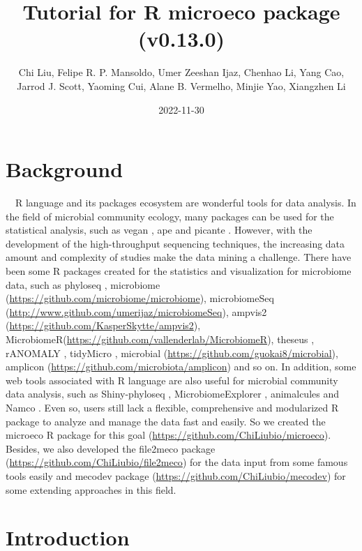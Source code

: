 \documentclass[
]{book}
\title{Tutorial for R microeco package (v0.13.0)}
\author{Chi Liu, Felipe R. P. Mansoldo, Umer Zeeshan Ijaz, Chenhao Li, Yang Cao, Jarrod J. Scott, Yaoming Cui, Alane B. Vermelho, Minjie Yao, Xiangzhen Li}
\date{2022-11-30}
\begin{document}
\maketitle

{
\setcounter{tocdepth}{1}
\tableofcontents
}
\hypertarget{background}{%
\chapter{Background}\label{background}}

　R language \citep{R-base} and its packages ecosystem are wonderful tools for data analysis.
In the field of microbial community ecology, many packages can be used for the statistical analysis,
such as vegan \citep{Jari_vegan_2019}, ape \citep{Paradis_ape_2018} and picante \citep{Picante_Kembel_2010}.
However, with the development of the high-throughput sequencing techniques,
the increasing data amount and complexity of studies make the data mining a challenge.
There have been some R packages created for the statistics and visualization for microbiome data,
such as phyloseq \citep{Mcmurdie_phyloseq_2013},
microbiome (\url{https://github.com/microbiome/microbiome}), microbiomeSeq (\url{http://www.github.com/umerijaz/microbiomeSeq}),
ampvis2 (\url{https://github.com/KasperSkytte/ampvis2}), MicrobiomeR(\url{https://github.com/vallenderlab/MicrobiomeR}),
theseus \citep{Price_theseus_2018}, rANOMALY \citep{Theil_rANOMALY_2021},
tidyMicro \citep{Carpenter_tidyMicro_2021}, microbial (\url{https://github.com/guokai8/microbial}),
amplicon (\url{https://github.com/microbiota/amplicon})
and so on.
In addition, some web tools associated with R language are also useful for microbial community data analysis,
such as Shiny-phyloseq \citep{McMurdie_Shiny_2015}, MicrobiomeExplorer \citep{Reeder_MicrobiomeExplorer_2021},
animalcules \citep{Zhao_animalcules_2021} and Namco \citep{Dietrich_Namco_2022}.
Even so, users still lack a flexible, comprehensive and modularized R package to analyze and manage the data fast and easily.
So we created the microeco R package \citep{Liu_microeco_2021} for this goal (\url{https://github.com/ChiLiubio/microeco}).
Besides, we also developed the file2meco package (\url{https://github.com/ChiLiubio/file2meco}) for the data input from some famous tools easily
and mecodev package (\url{https://github.com/ChiLiubio/mecodev}) for some extending approaches in this field.

\hypertarget{intro}{%
\chapter{Introduction}\label{intro}}
\end{document}
